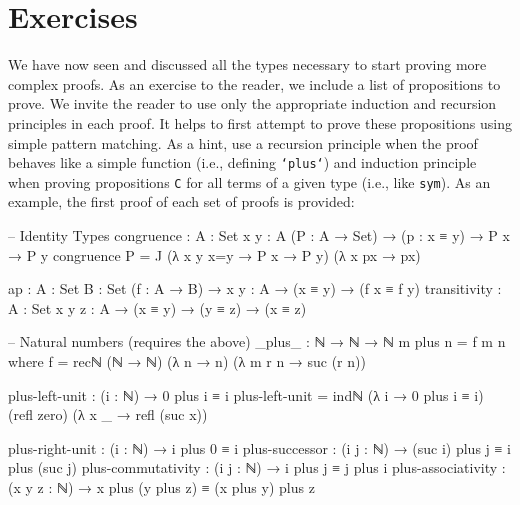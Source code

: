 \documentclass[12pt]{article}
\begin{document}
\section{Exercises}
We have now seen and discussed all the types necessary to start proving more
complex proofs. As an exercise to the reader, we include a list of propositions
to prove. We invite the reader to use only the appropriate induction and
recursion principles in each proof. It helps to first attempt to prove these
propositions using simple pattern matching. As a hint, use a recursion principle
when the proof behaves like a simple function (i.e., defining {\tt `plus`}) and
induction principle when proving propositions {\tt C} for all terms of a given
type (i.e., like {\tt sym}). As an example, the first proof of each set of
proofs is provided:

\begin{center}
\begin{minipage}{0.9\textwidth}
\begin{code}
-- Identity Types
congruence : {A : Set} {x y : A} (P : A → Set) →
             (p : x ≡ y) → P x → P y
congruence P = 
  J (λ {x y} x=y → P x → P y)
    (λ x px → px)

ap : {A : Set} {B : Set} (f : A → B) →
     {x y : A} → (x ≡ y) → (f x ≡ f y)
transitivity : {A : Set} {x y z : A} → (x ≡ y) →
               (y ≡ z) → (x ≡ z)
\end{code}
\end{minipage}
\end{center}

\begin{center}
\begin{minipage}{0.9\textwidth}
\begin{code}
-- Natural numbers (requires the above)
_plus_ : ℕ → ℕ → ℕ
m plus n = f m n where
  f = recℕ (ℕ → ℕ) (λ n → n) (λ m r n → suc (r n))

plus-left-unit : (i : ℕ) → 0 plus i ≡ i
plus-left-unit = 
  indℕ (λ i → 0 plus i ≡ i)
        (refl zero)
        (λ x _ → refl (suc x))

plus-right-unit : (i : ℕ) → i plus 0 ≡ i
plus-successor : (i j : ℕ) → (suc i) plus j ≡ i plus (suc j)
plus-commutativity : (i j : ℕ) → i plus j ≡ j plus i
plus-associativity : (x y z : ℕ) →
                     x plus (y plus z) ≡ (x plus y) plus z
\end{code}
\end{minipage}
\end{center}
\end{document}
